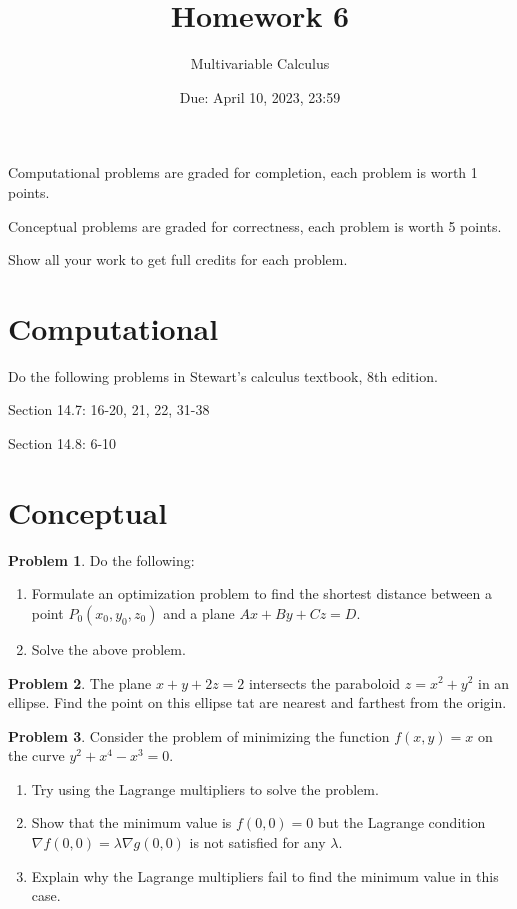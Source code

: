 \documentclass[12pt]{article}
\title{Homework 6}
\author{ Multivariable Calculus}
\date{Due: April 10, 2023, 23:59}
\theoremstyle{definition}
\newtheorem{problem}{Problem}
\begin{document}
\maketitle

Computational problems are graded for completion, each problem is worth 1 points.

Conceptual problems are graded for correctness, each problem is worth 5 points.

Show all your work to get full credits for each problem.
\section{Computational}
Do the following problems in Stewart's calculus textbook, 8th edition.


Section 14.7: 16-20, 21, 22, 31-38

Section 14.8: 6-10 




\section{Conceptual}

\begin{problem}
    Do the following:
    \begin{enumerate}
        \item Formulate an optimization problem
    to
    find the shortest distance between a point $P_0(x_0,y_0, z_0)$ and
    a plane $Ax + By + Cz = D$.
        \item Solve the above problem.
    \end{enumerate}
\end{problem}

\begin{problem}
    The plane $x+y+2z=2$ intersects the paraboloid $z = x^2 + y^2$ in an ellipse.
    Find the point on this ellipse tat are nearest and farthest from the origin.
\end{problem}

\begin{problem}
    Consider the problem of minimizing the function 
    $f(x,y) = x$ on the curve $y^2 + x^4-x^3 = 0$.
    \begin{enumerate}
        \item Try using the Lagrange multipliers to solve the problem.
        \item Show that the minimum value is $f(0,0) = 0$
            but the Lagrange condition $\nabla f(0,0) = \lambda \nabla g(0,0)$
            is not satisfied for any $\lambda$.
        \item Explain why the Lagrange multipliers fail to find the minimum value in this case.
    \end{enumerate}
\end{problem}

%
\end{document}

